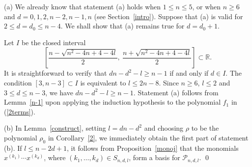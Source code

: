 \documentclass[11pt]{amsart}
\numberwithin{equation}{section}
\newcommand{\br}{\mathbb{R}}
\newcommand{\pndl}{\mathscr{P}_{n, d, l}}
\begin{document}
 (a) We already know that statement (a) holds when $1\le n\le5$, or when $n\ge6$ and $d=0,1,2,n-2,n-1,n$ (see Section~\ref{intro}). Suppose that (a) is valid for $2\le d=d_0\le n-4$.
We shall show that (a) remains true for $d=d_0+1$.

Let $I$ be the closed interval
\[
    \left[\frac{n-\sqrt{n^2-4n+4-4l}}{2},\ \frac{n+\sqrt{n^2-4n+4-4l}}{2}\right]\subset\br.
\]
It is straightforward to verify that $dn-d^2-l\ge n-1$ if and only if $d\in I$. The condition $[3,n-3]\subset I$ is equivalent to $l\le2n-8$. Since $n\ge6$, $l\le2$ and $3\le d\le n-3$, we have $dn-d^2-l\ge n-1$.
Statement (a) follows from Lemma~\ref{n-1} upon applying the induction hypothesis to the polynomial $f_1$ in (\ref{2terms}).

 (b) In Lemma~\ref{construct}, setting $l=dn-d^2$ and
 choosing $\rho$ to be the polynomial $\rho_0$ in Corollary~\ref{2}, we immediately obtain the first part of statement (b).
 If $l\le n-2d+1$, it follows from Proposition~\ref{monoj}
 that the monomials $x^{(k_1)}\cdots x^{(k_d)}$, where $(k_1,\dots,k_d)\in S_{n,d,l}$, form a basis for $\pndl$.
\qed


\end{document}
